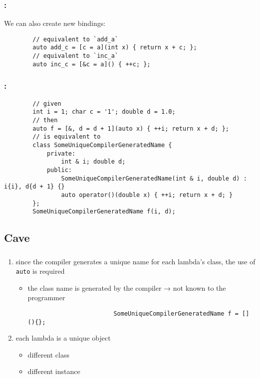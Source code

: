 \documentclass[aspectratio=43, t]{beamer}
\begin{document}
\begin{frame}[fragile]
	\frametitle{\secname: \subsecname\footnotemark[1]{}}

	We can also create new bindings:
	\begin{verbatim}
		// equivalent to `add_a`
		auto add_c = [c = a](int x) { return x + c; };
		// equivalent to `inc_a`
		auto inc_c = [&c = a]() { ++c; };
	\end{verbatim}
\end{frame}

\begin{frame}[fragile]
	\frametitle{\secname: \subsecname}

	\begin{verbatim}
		// given
		int i = 1; char c = '1'; double d = 1.0;
		// then
		auto f = [&, d = d + 1](auto x) { ++i; return x + d; };
		// is equivalent to
		class SomeUniqueCompilerGeneratedName {
			private:
				int & i; double d;
			public:
				SomeUniqueCompilerGeneratedName(int & i, double d) : i{i}, d{d + 1} {}
				auto operator()(double x) { ++i; return x + d; }
		};
		SomeUniqueCompilerGeneratedName f(i, d);
	\end{verbatim}
\end{frame}

\subsection*{Cave}
\begin{frame}[fragile]
	\frametitle{\secname}

	\begin{enumerate}
		\item since the compiler generates a unique name for each lambda's class, the use of \texttt{auto} is required
			\begin{itemize}
				\item the class name is generated by the compiler → not known to the programmer
					\begin{verbatim}
						SomeUniqueCompilerGeneratedName f = [](){};
					\end{verbatim}
			\end{itemize}
		\item each lambda is a unique object
			\begin{itemize}
				\item different class
				\item different instance
			\end{itemize}
	\end{enumerate}
\end{frame}
\end{document}
